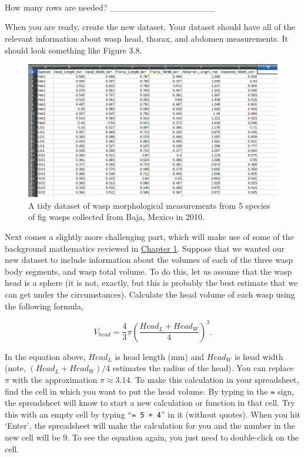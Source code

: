 \documentclass[
]{scrbook}
\begin{document}
\begin{verbatim}




\end{verbatim}

How many rows are needed? \_\_\_\_\_\_\_\_\_\_\_\_\_\_\_\_\_

When you are ready, create the new dataset.
Your dataset should have all of the relevant information about wasp head, thorax, and abdomen measurements.
It should look something like Figure 3.8.

\begin{figure}
\includegraphics[width=1\linewidth]{img/Ch1_Ex3_tidy} \caption{A tidy dataset of wasp morphological measurements from 5 species of fig wasps collected from Baja, Mexico in 2010.}\label{fig:unnamed-chunk-19}
\end{figure}

Next comes a slightly more challenging part, which will make use of some of the background mathematics reviewed in \protect\hyperlink{Chapter_1}{Chapter 1}.
Suppose that we wanted our new dataset to include information about the volumes of each of the three wasp body segments, and wasp total volume.
To do this, let us assume that the wasp head is a sphere (it is not, exactly, but this is probably the best estimate that we can get under the circumstances).
Calculate the head volume of each wasp using the following formula,

\[V_{head} = \frac{4}{3}\pi \left(\frac{Head_L + Head_W}{4}\right)^{3}.\]

In the equation above, \(Head_{L}\) is head length (mm) and \(Head_{W}\) is head width (note, \((Head_L + Head_W)/4\) estimates the radius of the head).
You can replace \(\pi\) with the approximation \(\pi \approx 3.14\).
To make this calculation in your spreadsheet, find the cell in which you want to put the head volume.
By typing in the \texttt{=} sign, the spreadsheet will know to start a new calculation or function in that cell.
Try this with an empty cell by typing ``\texttt{=\ 5\ +\ 4}'' in it (without quotes).
When you hit `Enter', the spreadsheet will make the calculation for you and the number in the new cell will be 9.
To see the equation again, you just need to double-click on the cell.
\end{document}
